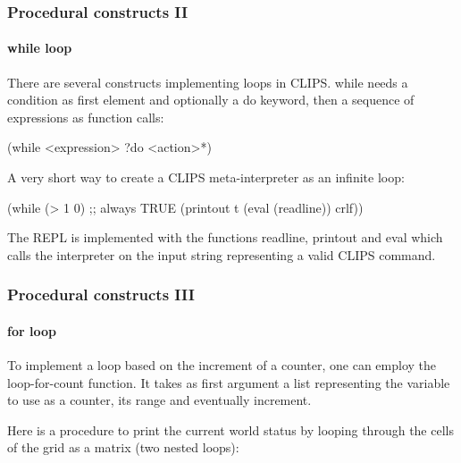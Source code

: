 \documentclass[xcolor={usenames,dvipsnames,svgnames}, compress]{beamer}
\begin{document}
\begin{frame}[fragile]
  \frametitle{Procedural constructs II}
  \framesubtitle{while loop}
  There are several constructs implementing loops in
  CLIPS. \textsf{while} needs a condition as first element and
  optionally a \textsf{do} keyword, then a sequence of expressions
  as function calls:
  \begin{clips-code}[numbers=none]
    (while <expression> ?do
           <action>*)
  \end{clips-code}\bigskip

         

  A very short way to create a CLIPS meta-interpreter as an infinite loop:
  \begin{clips-code}[numbers=none]
    (while (> 1 0) ;; always TRUE
        (printout t (eval (readline)) crlf))
  \end{clips-code}
  The REPL is implemented with the functions \textsf{readline},
  \textsf{printout} and \textsf{eval} which calls the interpreter on
  the input string representing a valid CLIPS command.
      
\end{frame}

\begin{frame}[fragile]
  \frametitle{Procedural constructs III}
  \framesubtitle{for loop}
  To implement a loop based on the increment of a counter, one can
  employ the \textsf{loop-for-count} function. It takes as first
  argument a list representing the variable to use as a counter, its
  range and eventually increment.\par\bigskip

  Here is a procedure to print the current world status by looping
  through the cells of the grid as a matrix (two nested loops):
\end{frame}
\end{document}
